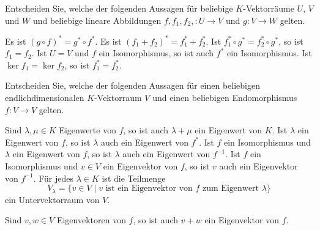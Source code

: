 \documentclass[a4paper,10pt]{exam}
\begin{document}
\begin{questions}

\question Entscheiden Sie, welche der folgenden Aussagen für beliebige $K$-Vektorräume $U$, $V$ und $W$ und beliebige lineare Abbildungen $f, f_1, f_2, \colon U \to V$ und $g \colon V \to W$ gelten.
\begin{checkboxes}
 \choice
  Es ist $(g \circ f)^* = g^* \circ f^*$.
 \choice
  Es ist $(f_1 + f_2)^* = f_1^* + f_2^*$.
 \choice
  Ist $f_1^* \circ g^* = f_2^* \circ g^*$, so ist $f_1 = f_2$.
 \choice
  Ist $U = V$ und $f$ ein Isomorphismus, so ist auch $f^*$ ein Isomorphismus.
 \choice
  Ist $\ker f_1 = \ker f_2$, so ist $f_1^* = f_2^*$.
\end{checkboxes}




\question Entscheiden Sie, welche der folgenden Aussagen für einen beliebigen endlichdimensionalen $K$-Vektorraum $V$ und einen beliebigen Endomorphismus $f \colon V \to V$ gelten.
\begin{checkboxes}
 \choice
  Sind $\lambda, \mu \in K$ Eigenwerte von $f$, so ist auch $\lambda + \mu$ ein Eigenwert von $K$.
 \choice
  Ist $\lambda$ ein Eigenwert von $f$, so ist $\lambda$ auch ein Eigenwert von $f^*$.
 \choice
  Ist $f$ ein Isomorphismus und $\lambda$ ein Eigenwert von $f$, so ist $\lambda$ auch ein Eigenwert von $f^{-1}$.
 \choice
  Ist $f$ ein Isomorphismus und $v \in V$ ein Eigenvektor von $f$, so ist $v$ auch ein Eigenvektor von $f^{-1}$.
 \choice
  Für jedes $\lambda \in K$ ist die Teilmenge
  \[
   V_\lambda = \{v \in V \mid \text{$v$ ist ein Eigenvektor von $f$ zum Eigenwert $\lambda$}\}
  \]
  ein Untervektorraum von $V$.
 \item
  Sind $v, w \in V$ Eigenvektoren von $f$, so ist auch $v + w$ ein Eigenvektor von $f$.
\end{checkboxes}






\end{questions}
\end{document}
